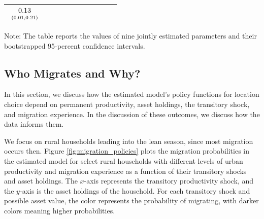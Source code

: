 \documentclass[12pt,pdftex]{article}
\begin{document}
\begin{table}[t]
\begin{tabular}{ccccccccccc}
$\begin{array}{c}0.13\vspace{-.1cm}\\ \scriptstyle (0.01, 0.21)\end{array}$ &
\\
\hline
\end{tabular}
\parbox[c]{6.75in}{\vspace{0.1cm}
{\footnotesize  Note: The table reports the values of nine jointly estimated parameters and their bootstrapped 95-percent confidence intervals.}}
\end{table}

\subsection{Who Migrates and Why?}

In this section, we discuss how the estimated model's policy functions for location choice depend on permanent productivity, asset holdings, the transitory shock, and migration experience. In the discussion of these outcomes, we discuss how the data informs them.

We focus on rural households leading into the lean season, since most migration occurs then. Figure \ref{fig:migration_policies} plots the migration probabilities in the estimated model for select rural households with different levels of urban productivity and migration experience as a function of their transitory shocks and asset holdings. The $x$-axis represents the transitory productivity shock, and the $y$-axis is the asset holdings of the household. For each transitory shock and possible asset value, the color represents the probability of migrating, with darker colors meaning higher probabilities.
\end{document}
